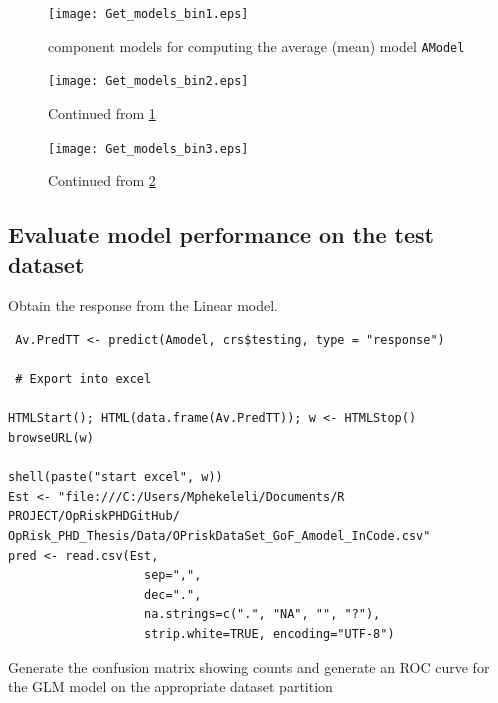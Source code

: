 \documentclass{DissertateUSU}
\begin{document}
\begin{figure}
\centering
\texttt{[image: Get\_models\_bin1.eps]}
\caption[Model averaging]{component models for computing the average (mean) model \texttt{AModel}}
\label{AModel_Summary1}
\end{figure}

\begin{figure}
\centering
\texttt{[image: Get\_models\_bin2.eps]}
\caption[Model averaging]{Continued from \ref{AModel_Summary1}}
\label{AModel_Summary2}
\end{figure}

\begin{figure}
\centering
\texttt{[image: Get\_models\_bin3.eps]}
\caption[Model averaging]{Continued from \ref{AModel_Summary2}}
\label{AModel_Summary3}
\end{figure}

\subsection{Evaluate model performance on the test dataset}
\label{sec:Evaluate model performance on the test dataset}

Obtain the response from the Linear model.

\small

\begin{verbatim}
 Av.PredTT <- predict(Amodel, crs$testing, type = "response")
 
 # Export into excel
 
HTMLStart(); HTML(data.frame(Av.PredTT)); w <- HTMLStop()
browseURL(w)
 
shell(paste("start excel", w))
Est <- "file:///C:/Users/Mphekeleli/Documents/R PROJECT/OpRiskPHDGitHub/
OpRisk_PHD_Thesis/Data/OPriskDataSet_GoF_Amodel_InCode.csv"
pred <- read.csv(Est,
                   sep=",",
                   dec=".",
                   na.strings=c(".", "NA", "", "?"),
                   strip.white=TRUE, encoding="UTF-8")
\end{verbatim}

\normalsize

Generate the confusion matrix showing counts and generate an ROC curve
for the GLM model on the appropriate dataset partition
\end{document}
